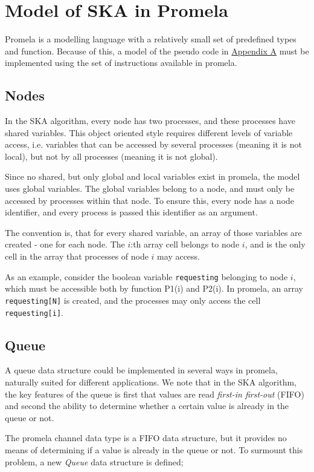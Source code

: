 \documentclass[a4paper,12pt]{article}
\begin{document}
\section{Model of SKA in Promela}
Promela is a modelling language with a relatively small set of predefined types and function. Because of this, a model of the pseudo code in \hyperref[sec:SKA]{Appendix A} must be implemented using the set of instructions available in promela.


\subsection{Nodes}
In the SKA algorithm, every node has two processes, and these processes have shared variables. This object oriented style requires different levels of variable access, i.e. variables that can be accessed by several processes (meaning it is not local), but not by all processes (meaning it is not global).

Since no shared, but only global and local variables exist in promela, the model uses global variables. The global variables belong to a node, and must only be accessed by processes within that node. To ensure this, every node has a node identifier, and every process is passed this identifier as an argument. 

The convention is, that for every shared variable, an array of those variables are created - one for each node. The $i$:th array cell belongs to node $i$, and is the only cell in the array that processes of node $i$ may access.

As an example, consider the boolean variable \texttt{requesting} belonging to node $i$, which must be accessible both by function P1(i) and P2(i). In promela, an array \texttt{requesting[N]} is created, and the processes may only access the cell \texttt{requesting[i]}.

\subsection{Queue}
A queue data structure could be implemented in several ways in promela, naturally suited for different applications. We note that in the SKA algorithm, the key features of the queue is first that values are read \emph{first-in first-out} (FIFO) and second the ability to determine whether a certain value is already in the queue or not.

The promela channel data type is a FIFO data structure, but it provides no means of determining if a value is already in the queue or not. To surmount this problem, a new \emph{Queue} data structure is defined;
\end{document}
